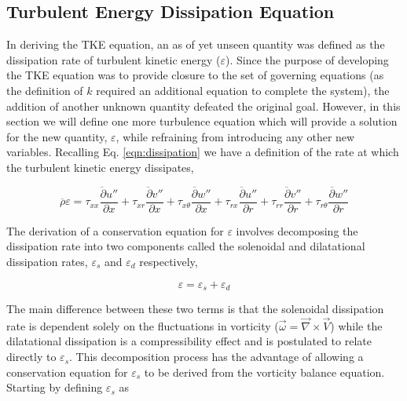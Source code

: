 \subsection{Turbulent Energy Dissipation Equation}

	In deriving the TKE equation, an as of yet unseen quantity was defined as the dissipation rate of turbulent kinetic
energy ($\varepsilon$).  Since the purpose of developing the TKE equation was to provide closure to the set of governing 
equations (as the definition of $k$ required an additional equation to complete the system), the addition of another unknown 
quantity defeated the original goal.  However, in this section we will define one more turbulence equation which will provide 
a solution for the new quantity, $\varepsilon$, while refraining from introducing any other new variables.  Recalling 
Eq. \ref{eqn:dissipation} we have a definition of the rate at which the turbulent kinetic energy dissipates,

\begin{displaymath}
	\overline{\rho} \varepsilon = \overline{\tau_{xx}\frac{\partial u''}{\partial x}} 
	+ \overline{\tau_{xr}\frac{\partial v''}{\partial x}} 
	+ \overline{\tau_{x\theta}\frac{\partial w''}{\partial x}} + \overline{\tau_{rx}\frac{\partial u''}{\partial r}}
	+ \overline{\tau_{rr}\frac{\partial v''}{\partial r}} + \overline{\tau_{r\theta}\frac{\partial w''}{\partial r}}
\end{displaymath} 

	The derivation of a conservation equation for $\varepsilon$ involves decomposing the dissipation rate into two
components called the solenoidal and dilatational dissipation rates, $\varepsilon_s$ and $\varepsilon_d$ respectively,

\begin{equation}
	\varepsilon = \varepsilon_s + \varepsilon_d
\label{eqn:epsilon}
\end{equation}

	The main difference between these two terms is that the solenoidal dissipation rate is dependent solely on the
fluctuations in vorticity ($\vec{\omega} = \vec{\nabla}  \times \vec{V}$) while the dilatational dissipation is a 
compressibility effect and is postulated to relate directly to $\varepsilon_s$.  This decomposition 
process has the advantage of allowing a conservation equation for $\varepsilon_s$ to be derived from the vorticity balance
equation.  Starting by defining $\varepsilon_s$ as


